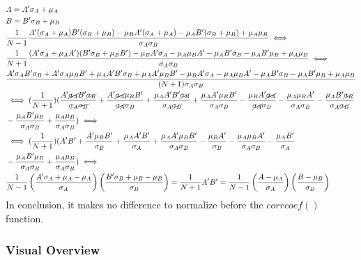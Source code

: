 \documentclass[12pt, a4paper]{article}
\begin{document}
\begin{equation*}
    \begin{split}
        & A =  A'\sigma_A + \mu_A\\
        & B =  B'\sigma_B + \mu_B\\
        & \frac{1}{N-1} \frac{A'(\sigma_A + \mu_A)B'(\sigma_B + \mu_B) -\mu_BA'(\sigma_A + \mu_A) -\mu_AB'(\sigma_B + \mu_B) +\mu_A\mu_B}{\sigma_A\sigma_B} \iff \\
        & \frac{1}{N+1} \frac{(A'\sigma_A + \mu_AA')(B'\sigma_B + \mu_BB') -\mu_BA'\sigma_A - \mu_A\mu_BA' -\mu_AB'\sigma_B - \mu_AB'\mu_B + \mu_A\mu_B}{\sigma_A\sigma_B} \iff \\
        & \frac{A'\sigma_AB'\sigma_B + A'\sigma_A\mu_BB' + \mu_AA'B'\sigma_B + \mu_AA'\mu_BB' -\mu_BA'\sigma_A - \mu_A\mu_BA' -\mu_AB'\sigma_B - \mu_AB'\mu_B + \mu_A\mu_B}{(N+1)\sigma_A\sigma_B} \\
        & \iff (\frac{1}{N+1}) (\frac{A'\cancel{\sigma_A}B'\cancel{\sigma_B}}{\cancel{\sigma_A\sigma_B}} + \frac{A'\cancel{\sigma_A}\mu_BB'}{\cancel{\sigma_A}\sigma_B}+ \frac{\mu_AA'B'\cancel{\sigma_B}}{\sigma_A\cancel{\sigma_B}} + \frac{\mu_AA'\mu_BB'}{\sigma_A\sigma_B}-\frac{\mu_BA'\cancel{\sigma_A}}{\cancel{\sigma_A}\sigma_B} - \frac{\mu_A\mu_BA'}{\sigma_A\sigma_B} -\frac{\mu_AB'\cancel{\sigma_B}}{\sigma_A\cancel{\sigma_B}} \\
        & - \frac{\mu_AB'\mu_B}{\sigma_A\sigma_B} + \frac{\mu_A\mu_B}{\sigma_A\sigma_B}) \iff \\
        & \iff (\frac{1}{N+1}) (A' B'  + \frac{A' \mu_BB'}{ \sigma_B}+ \frac{\mu_AA'B' }{\sigma_A } + \frac{\mu_AA'\mu_BB'}{\sigma_A\sigma_B}-\frac{\mu_BA' }{ \sigma_B} - \frac{\mu_A\mu_BA'}{\sigma_A\sigma_B} -\frac{\mu_AB' }{\sigma_A } \\
        & - \frac{\mu_AB'\mu_B}{\sigma_A\sigma_B} + \frac{\mu_A\mu_B}{\sigma_A\sigma_B}) \iff \\
        & \frac{1}{N-1}\left(\frac{A'\sigma_A + \mu_A -\mu_A}{\sigma_A}\right)\left(\frac{B'\sigma_B + \mu_B -\mu_B}{\sigma_B}\right) = \frac{1}{N+1}A'B' = \frac{1}{N-1}\left(\frac{A-\mu_A}{\sigma_A}\right)\left(\frac{B -\mu_B}{\sigma_B}\right)\\
    \end{split}
\end{equation*}
In conclusion, it makes no difference to normalize before the $corrcoef()$ function.

\subsubsection{Visual Overview}
\end{document}

